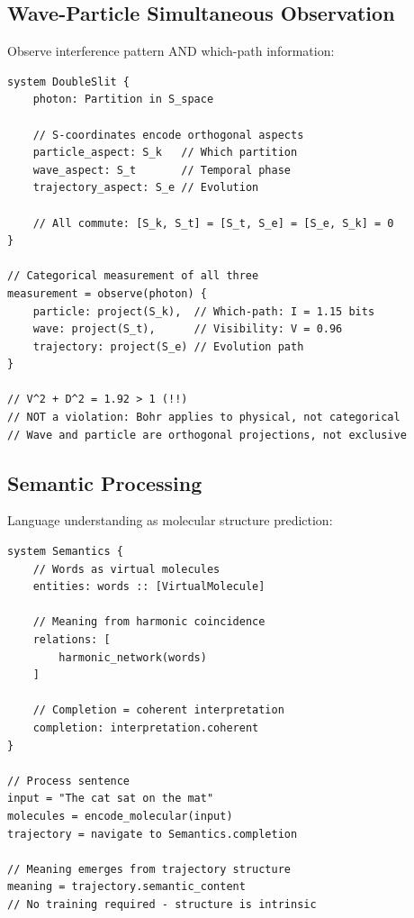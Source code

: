 \documentclass[twocolumn,10pt]{article}
\theoremstyle{remark}
\begin{document}
\subsection{Wave-Particle Simultaneous Observation}

Observe interference pattern AND which-path information:

\begin{lstlisting}
system DoubleSlit {
    photon: Partition in S_space

    // S-coordinates encode orthogonal aspects
    particle_aspect: S_k   // Which partition
    wave_aspect: S_t       // Temporal phase
    trajectory_aspect: S_e // Evolution

    // All commute: [S_k, S_t] = [S_t, S_e] = [S_e, S_k] = 0
}

// Categorical measurement of all three
measurement = observe(photon) {
    particle: project(S_k),  // Which-path: I = 1.15 bits
    wave: project(S_t),      // Visibility: V = 0.96
    trajectory: project(S_e) // Evolution path
}

// V^2 + D^2 = 1.92 > 1 (!!)
// NOT a violation: Bohr applies to physical, not categorical
// Wave and particle are orthogonal projections, not exclusive
\end{lstlisting}

\subsection{Semantic Processing}

Language understanding as molecular structure prediction:

\begin{lstlisting}
system Semantics {
    // Words as virtual molecules
    entities: words :: [VirtualMolecule]

    // Meaning from harmonic coincidence
    relations: [
        harmonic_network(words)
    ]

    // Completion = coherent interpretation
    completion: interpretation.coherent
}

// Process sentence
input = "The cat sat on the mat"
molecules = encode_molecular(input)
trajectory = navigate to Semantics.completion

// Meaning emerges from trajectory structure
meaning = trajectory.semantic_content
// No training required - structure is intrinsic
\end{lstlisting}

\end{document}
